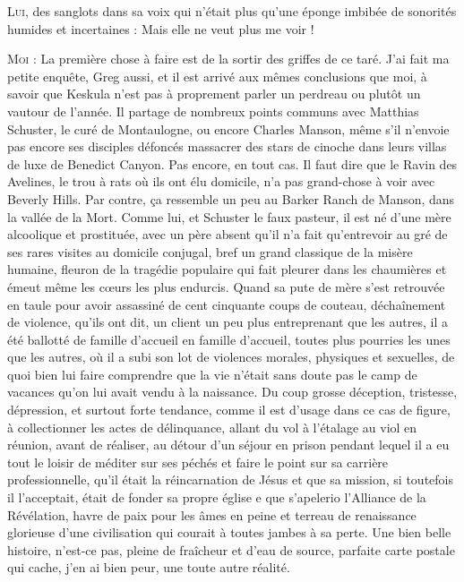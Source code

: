 \begin{dialogue}

\textsc{Lui}, des sanglots dans sa voix qui n’était plus qu’une éponge imbibée de sonorités humides et incertaines : Mais elle ne veut plus me voir !

\textsc{Moi} : La première chose à faire est de la sortir des griffes de ce taré. J’ai fait ma petite enquête, Greg aussi, et il est arrivé aux mêmes conclusions que moi, à savoir que Keskula n’est pas à proprement parler un perdreau ou plutôt un vautour de l’année. Il partage de nombreux points communs avec Matthias Schuster, le curé de Montaulogne, ou encore Charles Manson, même s’il n’envoie pas encore ses disciples défoncés massacrer des stars de cinoche dans leurs villas de luxe de Benedict Canyon. Pas encore, en tout cas. Il faut dire que le Ravin des Avelines, le trou à rats où ils ont élu domicile, n’a pas grand-chose à voir avec Beverly Hills. Par contre, ça ressemble un peu au Barker Ranch de Manson, dans la vallée de la Mort. Comme lui, et Schuster le faux pasteur, il est né d’une mère alcoolique et prostituée, avec un père absent qu’il n’a fait qu’entrevoir au gré de ses rares visites au domicile conjugal, bref un grand classique de la misère humaine, fleuron de la tragédie populaire qui fait pleurer dans les chaumières et émeut même les cœurs les plus endurcis. Quand sa pute de mère s’est retrouvée en taule pour avoir assassiné de cent cinquante coups de couteau, déchaînement de violence, qu’ils ont dit, un client un peu plus entreprenant que les autres, il a été ballotté de famille d’accueil en famille d’accueil, toutes plus pourries les unes que les autres, où il a subi son lot de violences morales, physiques et sexuelles, de quoi bien lui faire comprendre que la vie n’était sans doute pas le camp de vacances qu’on lui avait vendu à la naissance. Du coup grosse déception, tristesse, dépression, et surtout forte tendance, comme il est d’usage dans ce cas de figure, à collectionner les actes de délinquance, allant du vol à l’étalage au viol en réunion, avant de réaliser, au détour d’un séjour en prison pendant lequel il a eu tout le loisir de méditer sur ses péchés et faire le point sur sa carrière professionnelle, qu’il était la réincarnation de Jésus et que sa mission, si toutefois il l’acceptait, était de fonder sa propre église 
e que s’apelerio
l’Alliance de la Révélation, havre de paix pour les âmes en peine et terreau de renaissance glorieuse d’une civilisation qui courait à toutes jambes à sa perte. Une bien belle histoire, n’est-ce pas, pleine de fraîcheur et d’eau de source, parfaite carte postale qui cache, j’en ai bien peur, une toute autre réalité.


\end{dialogue}
